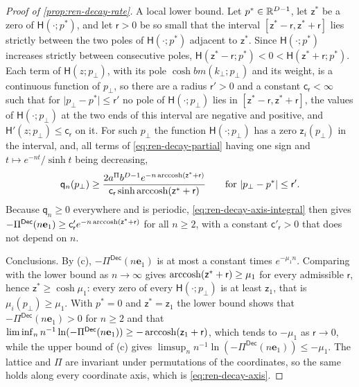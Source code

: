 \begin{proof}[Proof of \cref{prop:ren-decay-rate}]
A local lower bound. Let $p^\ast\in\mathbb{R}^{D-1}$, let $\mathsf z^\ast$ be a zero of $\mathsf H(\cdot;p^\ast)$, and let $\mathsf r>0$ be so small that the interval $[\mathsf z^\ast-\mathsf r,\mathsf z^\ast+\mathsf r]$ lies strictly between the two poles of $\mathsf H(\cdot;p^\ast)$ adjacent to $\mathsf z^\ast$. Since $\mathsf H(\cdot;p^\ast)$ increases strictly between consecutive poles, $\mathsf H(\mathsf z^\ast-\mathsf r;p^\ast)<0<\mathsf H(\mathsf z^\ast+\mathsf r;p^\ast)$. Each term of $\mathsf H(z;p_\perp)$, with its pole $\cosh bm(k_\perp;p_\perp)$ and its weight, is a continuous function of $p_\perp$, so there are a radius $\mathsf r'>0$ and a constant $\mathsf c_{\mathsf r}<\infty$ such that for $\lvert p_\perp-p^\ast\rvert\le\mathsf r'$ no pole of $\mathsf H(\cdot;p_\perp)$ lies in $[\mathsf z^\ast-\mathsf r,\mathsf z^\ast+\mathsf r]$, the values of $\mathsf H(\cdot;p_\perp)$ at the two ends of this interval are negative and positive, and $\mathsf H'(z;p_\perp)\le\mathsf c_{\mathsf r}$ on it. For such $p_\perp$ the function $\mathsf H(\cdot;p_\perp)$ has a zero $\mathsf z_i(p_\perp)$ in the interval, and, all terms of \eqref{eq:ren-decay-partial} having one sign and $t\mapsto e^{-nt}/\sinh t$ being decreasing,
\[
\mathsf q_n(p_\perp)\ge\frac{2a^\Pi b^{D-1}e^{-n\operatorname{arccosh}(\mathsf z^\ast+\mathsf r)}}{\mathsf c_{\mathsf r}\sinh\operatorname{arccosh}(\mathsf z^\ast+\mathsf r)}\qquad\text{for}\ \lvert p_\perp-p^\ast\rvert\le\mathsf r'.
\]
Because $\mathsf q_n\ge0$ everywhere and is periodic, \eqref{eq:ren-decay-axis-integral} then gives $-\Pi^{\mathsf{Dec}}(n\mathbf e_1)\ge\mathsf c'_{\mathsf r}e^{-n\operatorname{arccosh}(\mathsf z^\ast+\mathsf r)}$ for all $n\ge2$, with a constant $\mathsf c'_{\mathsf r}>0$ that does not depend on $n$.

Conclusions. By (c), $-\Pi^{\mathsf{Dec}}(n\mathbf e_1)$ is at most a constant times $e^{-\mu_1n}$. Comparing with the lower bound as $n\to\infty$ gives $\operatorname{arccosh}(\mathsf z^\ast+\mathsf r)\ge\mu_1$ for every admissible $\mathsf r$, hence $\mathsf z^\ast\ge\cosh\mu_1$: every zero of every $\mathsf H(\cdot;p_\perp)$ is at least $\mathsf z_1$, that is $\mu_i(p_\perp)\ge\mu_1$. With $p^\ast=0$ and $\mathsf z^\ast=\mathsf z_1$ the lower bound shows that $-\Pi^{\mathsf{Dec}}(n\mathbf e_1)>0$ for $n\ge2$ and that $\liminf_nn^{-1}\ln(-\Pi^{\mathsf{Dec}}(n\mathbf e_1))\ge-\operatorname{arccosh}(\mathsf z_1+\mathsf r)$, which tends to $-\mu_1$ as $\mathsf r\to0$, while the upper bound of (c) gives $\limsup_nn^{-1}\ln(-\Pi^{\mathsf{Dec}}(n\mathbf e_1))\le-\mu_1$. The lattice and $\Pi$ are invariant under permutations of the coordinates, so the same holds along every coordinate axis, which is \eqref{eq:ren-decay-axis}.


\end{proof}
